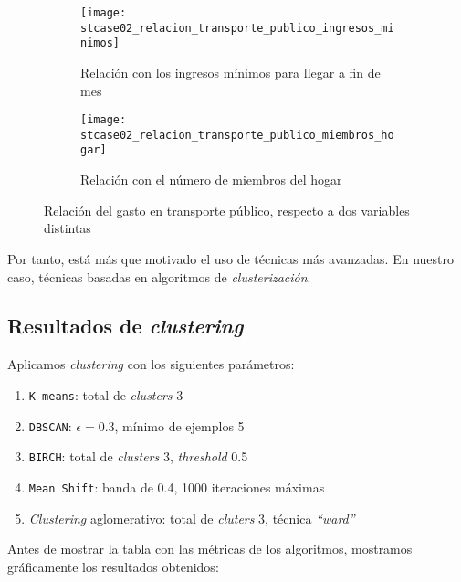 \documentclass[11pt]{article}
\newcommand{\entrecomillado}[1]{\emph{``#1''}}
\begin{document}
\begin{figure}[H]
    \centering

    \begin{subfigure}[b]{0.45 \textwidth}
        \texttt{[image: stcase02\_relacion\_transporte\_publico\_ingresos\_minimos]}
        \caption{Relación con los ingresos mínimos para llegar a fin de mes}
    \end{subfigure}
    \begin{subfigure}[b]{0.45 \textwidth}
        \texttt{[image: stcase02\_relacion\_transporte\_publico\_miembros\_hogar]}
        \caption{Relación con el número de miembros del hogar}
    \end{subfigure}

    \caption{Relación del gasto en transporte público, respecto a dos variables distintas}
    \label{stcase02_relacion_tpublico_resto_variables:figure}
\end{figure}

Por tanto, está más que motivado el uso de técnicas más avanzadas. En nuestro caso, técnicas basadas en algoritmos de \emph{clusterización}.

\pagebreak

\subsection{Resultados de \emph{clustering}} \label{stcase01_parametros:seccion}

Aplicamos \emph{clustering} con los siguientes parámetros:

\begin{enumerate}
    \item \lstinline{K-means}: total de \emph{clusters} 3
    \item \lstinline{DBSCAN}: $\epsilon = 0.3$, mínimo de ejemplos 5
    \item \lstinline{BIRCH}: total de \emph{clusters} 3, \emph{threshold} 0.5
    \item \lstinline{Mean Shift}: banda de 0.4, 1000 iteraciones máximas
    \item \emph{Clustering} aglomerativo: total de \emph{cluters} 3, técnica \entrecomillado{ward}
\end{enumerate}

Antes de mostrar la tabla con las métricas de los algoritmos, mostramos gráficamente los resultados obtenidos:
\end{document}
